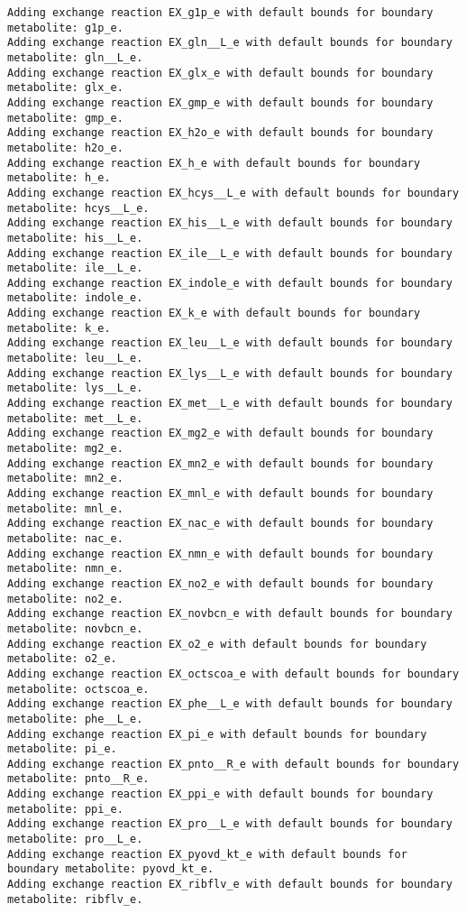 \documentclass[
  letterpaper,
  DIV=11,
  numbers=noendperiod]{scrartcl}
\begin{document}
\begin{verbatim}
Adding exchange reaction EX_g1p_e with default bounds for boundary metabolite: g1p_e.
Adding exchange reaction EX_gln__L_e with default bounds for boundary metabolite: gln__L_e.
Adding exchange reaction EX_glx_e with default bounds for boundary metabolite: glx_e.
Adding exchange reaction EX_gmp_e with default bounds for boundary metabolite: gmp_e.
Adding exchange reaction EX_h2o_e with default bounds for boundary metabolite: h2o_e.
Adding exchange reaction EX_h_e with default bounds for boundary metabolite: h_e.
Adding exchange reaction EX_hcys__L_e with default bounds for boundary metabolite: hcys__L_e.
Adding exchange reaction EX_his__L_e with default bounds for boundary metabolite: his__L_e.
Adding exchange reaction EX_ile__L_e with default bounds for boundary metabolite: ile__L_e.
Adding exchange reaction EX_indole_e with default bounds for boundary metabolite: indole_e.
Adding exchange reaction EX_k_e with default bounds for boundary metabolite: k_e.
Adding exchange reaction EX_leu__L_e with default bounds for boundary metabolite: leu__L_e.
Adding exchange reaction EX_lys__L_e with default bounds for boundary metabolite: lys__L_e.
Adding exchange reaction EX_met__L_e with default bounds for boundary metabolite: met__L_e.
Adding exchange reaction EX_mg2_e with default bounds for boundary metabolite: mg2_e.
Adding exchange reaction EX_mn2_e with default bounds for boundary metabolite: mn2_e.
Adding exchange reaction EX_mnl_e with default bounds for boundary metabolite: mnl_e.
Adding exchange reaction EX_nac_e with default bounds for boundary metabolite: nac_e.
Adding exchange reaction EX_nmn_e with default bounds for boundary metabolite: nmn_e.
Adding exchange reaction EX_no2_e with default bounds for boundary metabolite: no2_e.
Adding exchange reaction EX_novbcn_e with default bounds for boundary metabolite: novbcn_e.
Adding exchange reaction EX_o2_e with default bounds for boundary metabolite: o2_e.
Adding exchange reaction EX_octscoa_e with default bounds for boundary metabolite: octscoa_e.
Adding exchange reaction EX_phe__L_e with default bounds for boundary metabolite: phe__L_e.
Adding exchange reaction EX_pi_e with default bounds for boundary metabolite: pi_e.
Adding exchange reaction EX_pnto__R_e with default bounds for boundary metabolite: pnto__R_e.
Adding exchange reaction EX_ppi_e with default bounds for boundary metabolite: ppi_e.
Adding exchange reaction EX_pro__L_e with default bounds for boundary metabolite: pro__L_e.
Adding exchange reaction EX_pyovd_kt_e with default bounds for boundary metabolite: pyovd_kt_e.
Adding exchange reaction EX_ribflv_e with default bounds for boundary metabolite: ribflv_e.

\end{verbatim}
\end{document}

